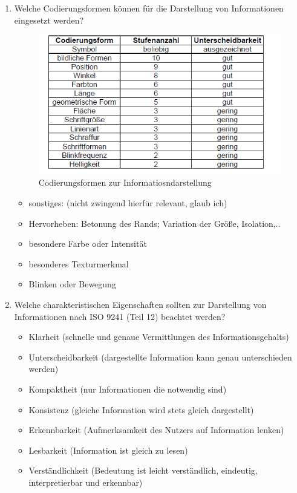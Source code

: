\begin{enumerate}
	\item  Welche Codierungsformen können für die Darstellung von Informationen
	eingesetzt werden?
	\begin{figure}[!h]
		\centering
		\includegraphics[scale=0.5]{img/codierungsformen.png}
		\caption{Codierungsformen zur Informatiosndarstellung}
	\end{figure}
	\begin{itemize}
		\item sonstiges: (nicht zwingend hierfür relevant, glaub ich)
		\item Hervorheben: Betonung des Rands; Variation der Größe, Isolation,..
		\item besondere Farbe oder Intensität
		\item besonderes Texturmerkmal
		\item Blinken oder Bewegung
	\end{itemize}
	
	\item Welche charakteristischen Eigenschaften sollten zur Darstellung von
	Informationen nach ISO 9241 (Teil 12) beachtet werden?
	\begin{itemize}
		\item Klarheit (schnelle und genaue Vermittlungen des Informationsgehalts)
		\item Unterscheidbarkeit (dargestellte Information kann genau unterschieden werden)
		\item Kompaktheit (nur Informationen die notwendig sind)
		\item Konsistenz (gleiche Information wird stets gleich dargestellt)
		\item Erkennbarkeit (Aufmerksamkeit des Nutzers auf Information lenken)
		\item Lesbarkeit (Information ist gleich zu lesen)
		\item Verständlichkeit (Bedeutung ist leicht verständlich, eindeutig, interpretierbar und erkennbar)
	\end{itemize}
	

\end{enumerate}
